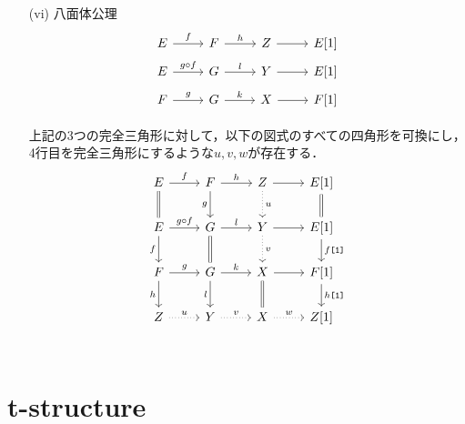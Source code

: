 \documentclass[leqno]{ltjsarticle}
\begin{document}
\begin{itemize}
	\item[(vi)]
		八面体公理\\
			\[
				\begin{tikzcd}[row sep=5pt]
			E \ar[r,"f"]& F\ar[r,"h"]& Z \ar[r]& E[1]\\
			E \ar[r,"g\circ f"]& G\ar[r,"l"]& Y \ar[r]& E[1]\\
			F \ar[r,"g"]& G\ar[r,"k"]& X \ar[r]& F[1]\\
		\end{tikzcd}
			\]
	上記の3つの完全三角形に対して，以下の図式のすべての四角形を可換にし，4行目を完全三角形にするような$u,v,w$が存在する．
			\[
		\begin{tikzcd}
			E \ar[r,"f"]\ar[d,equal]& F\ar[r,"h"]\ar[d,"g",swap]& Z\ar[d,"u",dotted] \ar[r]& E[1]\ar[d,equal]\\
			E \ar[r,"g\circ f"]\ar[d,"f",swap]& G\ar[r,"l"]\ar[d,equal]& Y\ar[d,"v",dotted] \ar[r]& E[1]\ar[d,"f\texttt{[1]}"]\\
			F \ar[r,"g"]\ar[d,"h",swap]& G\ar[r,"k"]\ar[d,"l",swap]& X \ar[r]\ar[d,equal]& F[1]\ar[d,"h\texttt{[1]}"]\\
			Z \ar[r,"u",dotted]& Y\ar[r,"v",dotted]& X \ar[r,"w",dotted]& Z[1]\\
		\end{tikzcd}
			\]
	\end{itemize}
\section{t-structure}
\end{document}
